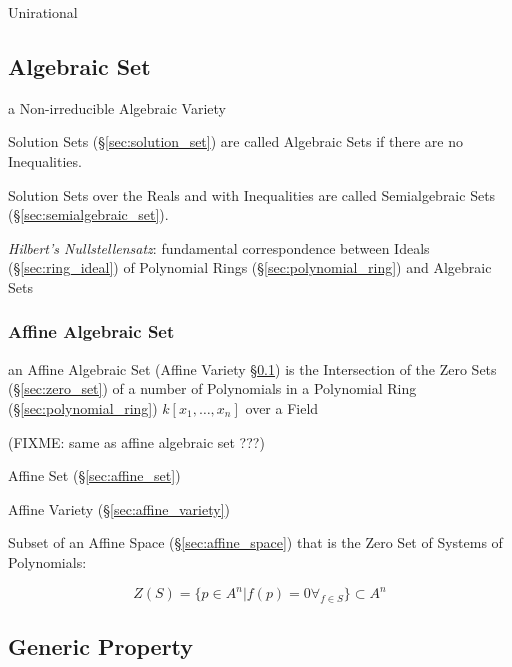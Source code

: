 Unirational



\subsection{Algebraic Set}\label{sec:algebraic_set}

a Non-irreducible Algebraic Variety

Solution Sets (\S\ref{sec:solution_set}) are called Algebraic Sets if there are
no Inequalities.

Solution Sets over the Reals and with Inequalities are called Semialgebraic
Sets (\S\ref{sec:semialgebraic_set}).

\emph{Hilbert's Nullstellensatz}: fundamental correspondence between Ideals
(\S\ref{sec:ring_ideal}) of Polynomial Rings (\S\ref{sec:polynomial_ring}) and
Algebraic Sets



\subsubsection{Affine Algebraic Set}\label{sec:affine_algebraic_set}

an Affine Algebraic Set (Affine Variety \S\ref{sec:algebraic_set}) is the
Intersection of the Zero Sets (\S\ref{sec:zero_set}) of a number of Polynomials
in a Polynomial Ring (\S\ref{sec:polynomial_ring}) $k[x_1,\ldots,x_n]$ over a
Field

(FIXME: same as affine algebraic set ???)


Affine Set (\S\ref{sec:affine_set})

Affine Variety (\S\ref{sec:affine_variety})

Subset of an Affine Space (\S\ref{sec:affine_space}) that is the Zero Set of
Systems of Polynomials:

\[
  Z(S) = \{ p \in A^n | f(p) = 0 \forall_{f \in S} \} \subset A^n
\]



\subsection{Generic Property}\label{sec:generic_property}

